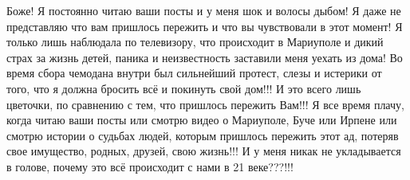  
 
 
 
 

\qqSecCmt


Боже! Я постоянно читаю ваши посты и у меня шок и волосы дыбом! Я даже не
представляю что вам пришлось пережить и что вы чувствовали в этот момент! Я
только лишь наблюдала по телевизору, что происходит в Мариуполе и дикий страх
за жизнь детей, паника и неизвестность заставили меня уехать из дома! Во время
сбора чемодана внутри был сильнейший протест, слезы и истерики от того, что я
должна бросить всё и покинуть свой дом!!! И это всего лишь цветочки, по
сравнению с тем, что пришлось пережить Вам!!! Я все время плачу, когда читаю
ваши посты или смотрю видео о Мариуполе, Буче или Ирпене или смотрю истории о
судьбах людей, которым пришлось пережить этот ад, потеряв свое имущество,
родных, друзей, свою жизнь!!! И у меня никак не укладывается в голове, почему
это всё происходит с нами в 21 веке???!!!
